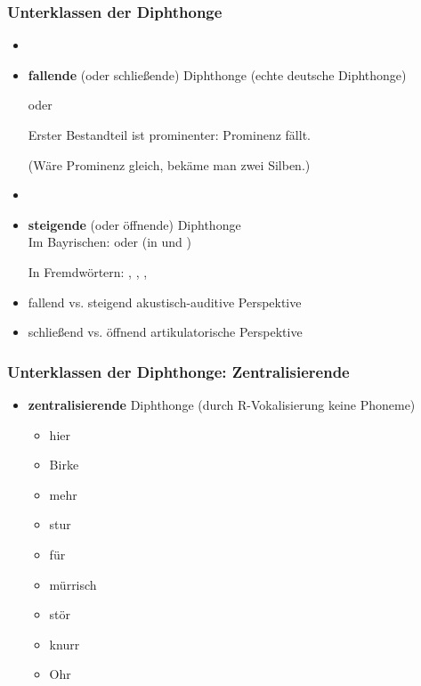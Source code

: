 \begin{frame}
\frametitle{Unterklassen der Diphthonge}
		
		\begin{itemize}
			\item[]
			\item \textbf{fallende} (oder schließende) Diphthonge (echte deutsche Diphthonge)

			\ea {} oder 
			\z

                        Erster Bestandteil ist prominenter: Prominenz fällt.

                        (Wäre Prominenz gleich, bekäme man zwei Silben.)

			\item[]
			\item \textbf{steigende} (oder öffnende) Diphthonge\\

			\ea Im Bayrischen: \textipa{[ \t{ɪa} , \t{ʊa} ]} oder  (in  und )
			\z
			
			\ea In Fremdwörtern: , , , 
			\z
			
			\item fallend vs. steigend \ras akustisch-auditive Perspektive
			\item schließend vs. öffnend \ras artikulatorische Perspektive
		\end{itemize}
		
\end{frame}


\begin{frame}
\frametitle{Unterklassen der Diphthonge: Zentralisierende}

	\begin{itemize}
		\item \textbf{zentralisierende} Diphthonge (durch R-Vokalisierung \ras keine Phoneme)

		\ea 
		\begin{itemize}
			\item {} \ras hier
			\item {} \ras Birke
			\item {} \ras mehr
			\item {} \ras stur
			\item {} \ras für
			\item {} \ras mürrisch
			\item {} \ras stör
			\item {} \ras knurr
			\item {} \ras Ohr
		\end{itemize}
		\z
		
	\end{itemize}

\end{frame}


